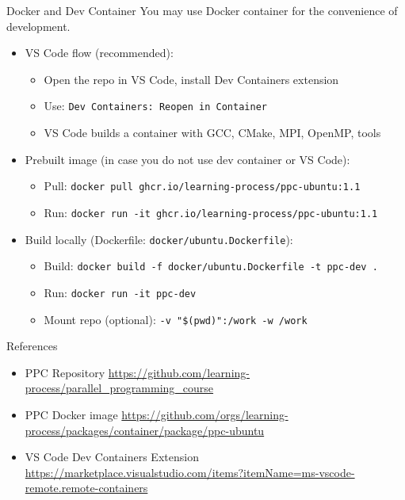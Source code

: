 \documentclass{beamer}
\begin{document}
\begin{frame}[fragile]{Docker and Dev Container}
  You may use Docker container for the convenience of development.
  \begin{itemize}
    \item VS Code flow (recommended):
      \begin{itemize}
        \item Open the repo in VS Code, install Dev Containers extension
        \item Use: \verb|Dev Containers: Reopen in Container|
        \item VS Code builds a container with GCC, CMake, MPI, OpenMP, tools
      \end{itemize}
    \item Prebuilt image (in case you do not use dev container or VS Code):
      \begin{itemize}
        \item Pull: \verb|docker pull ghcr.io/learning-process/ppc-ubuntu:1.1|
        \item Run: \verb|docker run -it ghcr.io/learning-process/ppc-ubuntu:1.1|
      \end{itemize}
    \item Build locally (Dockerfile: \texttt{docker/ubuntu.Dockerfile}):
      \begin{itemize}
        \item Build: \verb|docker build -f docker/ubuntu.Dockerfile -t ppc-dev .|
        \item Run: \verb|docker run -it ppc-dev|
        \item Mount repo (optional): \verb|-v "$(pwd)":/work -w /work|
      \end{itemize}
  \end{itemize}
\end{frame}

\begin{frame}{References}
  \begin{itemize}
    \item PPC Repository \href{https://github.com/learning-process/parallel\_programming\_course}{https://github.com/learning-process/parallel\_programming\_course}
    \item PPC Docker image \href{https://github.com/orgs/learning-process/packages/container/package/ppc-ubuntu}{https://github.com/orgs/learning-process/packages/container/package/ppc-ubuntu}
    \item VS Code Dev Containers Extension \href{https://marketplace.visualstudio.com/items?itemName=ms-vscode-remote.remote-containers}{https://marketplace.visualstudio.com/items?itemName=ms-vscode-remote.remote-containers}
  \end{itemize}
\end{frame}
\end{document}
